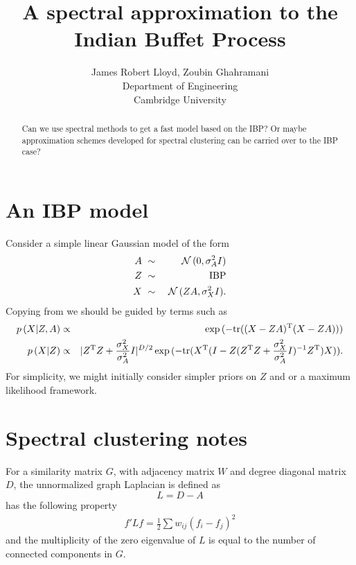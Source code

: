 \documentclass{article}
\title{
A spectral approximation to the Indian Buffet Process
}
\author{
James Robert Lloyd, Zoubin Ghahramani\\
Department of Engineering\\
Cambridge University\\
}
\numberwithin{equation}{section}
\numberwithin{thm}{section}
\def\IBP{Z}
\def\Weights{A}
\def\Data{X}
\def\Graph{G}
\def\Adjacency{W}
\def\Degree{D}
\def\Laplacian{L}
\begin{document}
\maketitle

\begin{abstract}
Can we use spectral methods to get a fast model based on the IBP?
Or maybe approximation schemes developed for spectral clustering can be carried over to the IBP case?
\end{abstract}

\section{An IBP model}

Consider a simple linear Gaussian model of the form
\begin{eqnarray}
\Weights & \dist & \Normal\,(0, \sigma_\Weights^2 I) \\
\IBP & \dist & \textrm{IBP} \\
\Data & \dist & \Normal\,(\IBP \Weights, \sigma_\Data^2 I).
\end{eqnarray}
Copying from \cite{Griffiths2011} we should be guided by terms such as
\begin{eqnarray}
p\,(\Data | \IBP, \Weights) & \propto & \exp\,(-\textrm{tr}((\Data - \IBP\Weights)\Transpose(\Data - \IBP\Weights))) \\
p\,(\Data | \IBP) & \propto & |\IBP\Transpose\IBP + \frac{\sigma_\Data^2}{\sigma_\Weights^2}I|^{D/2} \exp\,(-\textrm{tr}(\Data\Transpose(I - \IBP(\IBP\Transpose\IBP + \frac{\sigma_\Data^2}{\sigma_\Weights^2}I)^{-1}\IBP\Transpose)\Data)).
\end{eqnarray}
For simplicity, we might initially consider simpler priors on $\IBP$ and or a maximum likelihood framework.
\section{Spectral clustering notes}

For a similarity matrix $\Graph$, with adjacency matrix $\Adjacency$ and degree diagonal matrix $\Degree$, the unnormalized graph Laplacian is defined as
\begin{equation}
\Laplacian = \Degree - \Weights
\end{equation}
has the following property \citep{Luxburg2007}
\begin{eqnarray}
f' \Laplacian f = \frac{1}{2}\sum w_{ij}(f_i - f_j)^2
\end{eqnarray}
and the multiplicity of the zero eigenvalue of $\Laplacian$ is equal to the number of connected components in $\Graph$.
\end{document}
